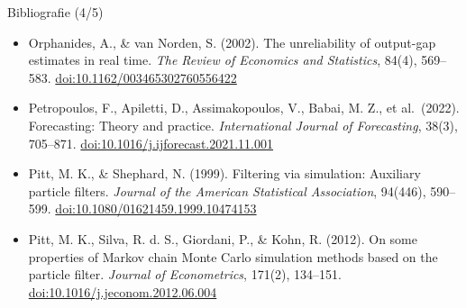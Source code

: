 \begin{frame}{Bibliografie (4/5)}
\begin{itemize}
    \item Orphanides, A., \& van Norden, S. (2002). The unreliability of output-gap estimates in real time. \textit{The Review of Economics and Statistics}, 84(4), 569--583. \href{https://doi.org/10.1162/003465302760556422}{doi:10.1162/003465302760556422}
    \item Petropoulos, F., Apiletti, D., Assimakopoulos, V., Babai, M. Z., et al.\ (2022). Forecasting: Theory and practice. \textit{International Journal of Forecasting}, 38(3), 705--871. \href{https://doi.org/10.1016/j.ijforecast.2021.11.001}{doi:10.1016/j.ijforecast.2021.11.001}
    \item Pitt, M. K., \& Shephard, N. (1999). Filtering via simulation: Auxiliary particle filters. \textit{Journal of the American Statistical Association}, 94(446), 590--599. \href{https://doi.org/10.1080/01621459.1999.10474153}{doi:10.1080/01621459.1999.10474153}
    \item Pitt, M. K., Silva, R. d. S., Giordani, P., \& Kohn, R. (2012). On some properties of Markov chain Monte Carlo simulation methods based on the particle filter. \textit{Journal of Econometrics}, 171(2), 134--151. \href{https://doi.org/10.1016/j.jeconom.2012.06.004}{doi:10.1016/j.jeconom.2012.06.004}
\end{itemize}
\end{frame}

